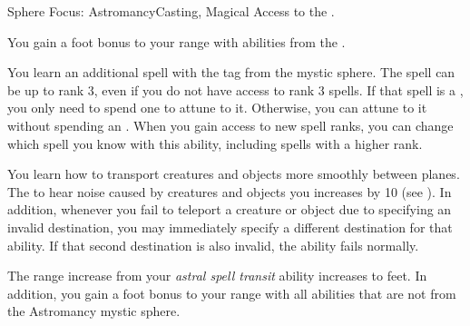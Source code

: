     \begin{magicalfeat}{Sphere Focus: Astromancy}{Casting, Magical}
        \featpre Access to the  .

         You gain a  foot bonus to your range with abilities from the  .

         You learn an additional spell with the  tag from the  mystic sphere.
        The spell can be up to rank 3, even if you do not have access to rank 3 spells.
        If that spell is a , you only need to spend one  to attune to it.
        Otherwise, you can attune to it without spending an .
        When you gain access to new spell ranks, you can change which spell you know with this ability, including spells with a higher rank.

         You learn how to transport creatures and objects more smoothly between planes.
        The  to hear noise caused by creatures and objects you  increases by 10 (see ).
        In addition, whenever you fail to teleport a creature or object due to specifying an invalid destination, you may immediately specify a different destination for that ability.
        If that second destination is also invalid, the ability fails normally.

         The range increase from your \textit{astral spell transit} ability increases to  feet.
        In addition, you gain a  foot bonus to your range with all \magical abilities that are not from the Astromancy mystic sphere.
    \end{magicalfeat}

